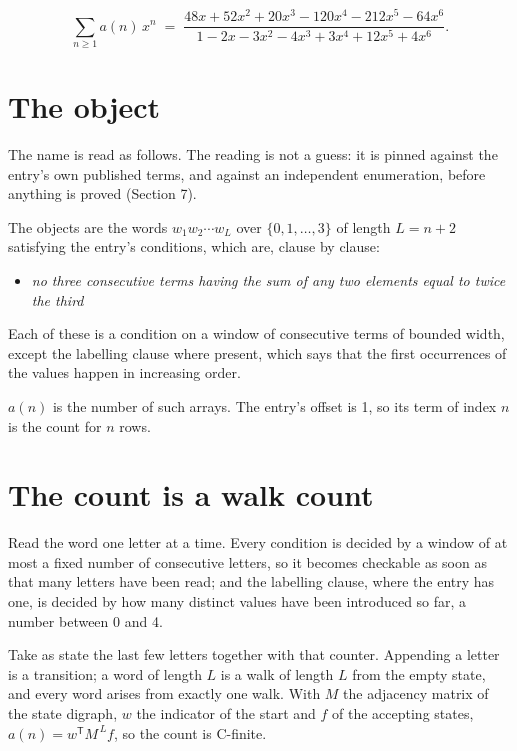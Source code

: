 \documentclass[11pt]{article}
\theoremstyle{definition}
\begin{document}
\[\sum_{n \ge 1} a(n)\,x^n \;=\; \frac{48x + 52x^{2} + 20x^{3} - 120x^{4} - 212x^{5} - 64x^{6}}{1 - 2x - 3x^{2} - 4x^{3} + 3x^{4} + 12x^{5} + 4x^{6}}.\]

\section{The object}

The name is read as follows. The reading is not a guess: it is pinned against the entry's own published terms, and against an independent enumeration, before anything is proved (Section 7).

The objects are the words $w_1 w_2 \cdots w_L$ over $\{0,1,\dots,3\}$ of length $L = n + 2$ satisfying the entry's conditions, which are, clause by clause:

\begin{itemize}

\item {\itshape no three consecutive terms having the sum of any two elements equal to twice the third}

\end{itemize}

Each of these is a condition on a window of consecutive terms of bounded width, except the labelling clause where present, which says that the first occurrences of the values happen in increasing order.

$a(n)$ is the number of such arrays. The entry's offset is 1, so its term of index $n$ is the count for $n$ rows.

\section{The count is a walk count}

Read the word one letter at a time. Every condition is decided by a window of at most a fixed number of consecutive letters, so it becomes checkable as soon as that many letters have been read; and the labelling clause, where the entry has one, is decided by how many distinct values have been introduced so far, a number between $0$ and 4.

Take as state the last few letters together with that counter. Appending a letter is a transition; a word of length $L$ is a walk of length $L$ from the empty state, and every word arises from exactly one walk. With $M$ the adjacency matrix of the state digraph, $w$ the indicator of the start and $f$ of the accepting states, $a(n) = w^{\mathsf T}M^{\,L}f$, so the count is C-finite.
\end{document}
